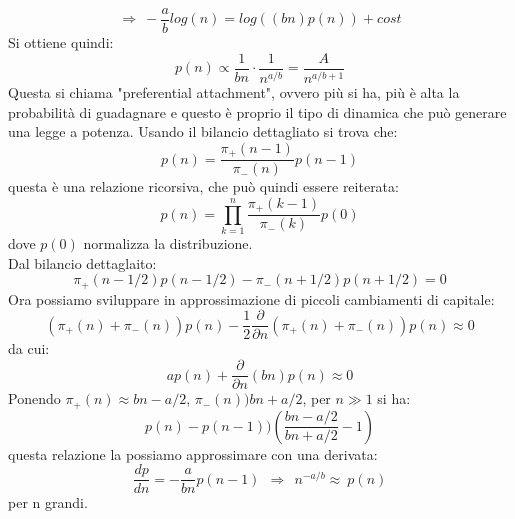 \documentclass[12pt]{article}
\begin{document}
$$
	\Longrightarrow \ -\frac{a}{b}log(n) = log\left((bn)p(n)\right) + cost
$$
Si ottiene quindi:
\begin{equation}
	p(n) \propto \frac{1}{bn} \cdot \frac{1}{n^{a/b}} = \frac{A}{n^{a/b+1}}
\end{equation}
Questa si chiama "preferential attachment", ovvero più si ha, più è alta la probabilità di guadagnare e questo è proprio il tipo di dinamica che può generare una legge a potenza. 
Usando il bilancio dettagliato si trova che:
$$
	p(n) = \frac{\pi_+(n-1)}{\pi_-(n)}p(n-1)
$$
questa è una relazione ricorsiva, che può quindi essere reiterata:
$$
	p(n) = \prod_{k=1}^n \frac{\pi_+(k-1)}{\pi_-(k)}p(0)
$$
dove $p(0)$ normalizza la distribuzione. \\
Dal bilancio dettaglaito:
$$
	\pi_+(n-1/2)p(n-1/2) - \pi_-(n+1/2)p(n+1/2) = 0
$$
Ora possiamo sviluppare in approssimazione di piccoli cambiamenti di capitale:
$$
	(\pi_+(n)+\pi_-(n))p(n) - \frac{1}{2}\frac{\partial}{\partial n} (\pi_+(n)+\pi_-(n))p(n) \approx 0
$$
da cui:
$$
	a p(n) + \frac{\partial}{\partial n}(bn)p(n) \approx 0
$$
Ponendo $\pi_+(n) \approx bn - a/2$, $\pi_-(n) ) bn + a/2$, per $n \gg 1$ si ha:
$$
	p(n) - p(n-1) ) \left( \frac{bn-a/2}{bn + a/2}-1\right)
$$
questa relazione la possiamo approssimare con una derivata:
$$
	\frac{dp}{dn} = -\frac{a}{bn}p(n-1) \ \ \Longrightarrow \ \ n^{-a/b} \approx \ p(n)
$$
per n grandi.
\end{document}
